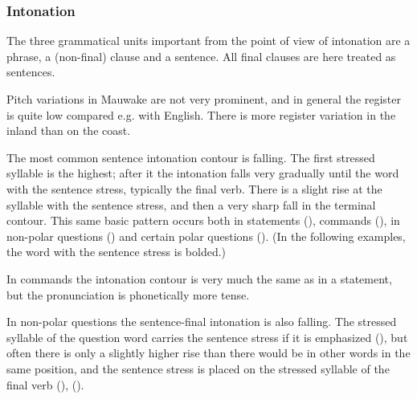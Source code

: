 \subsubsection[Intonation]{Intonation}


The three grammatical units important from the point of view of intonation are a phrase, a (non-final) clause and a sentence. All final clauses are here treated as sentences.

Pitch variations in Mauwake are not very prominent, and in general the register is quite low compared e.g. with English. There is more register variation in the inland than on the coast. 

The most common sentence intonation contour is falling. The first stressed syllable is the highest; after it the intonation falls very gradually until the word with the sentence stress, typically the final verb. There is a slight rise at the syllable with the sentence stress, and then a very sharp fall in the terminal contour.  This same basic pattern occurs both in statements (), commands (), in non-polar questions () and certain polar questions (). (In the following examples, the word with the sentence stress is bolded.)




In commands the intonation contour is very much the same as in a statement, but the pronunciation is phonetically more tense.



In non-polar questions the sentence-final intonation is also falling. The stressed syllable of the question word carries the sentence stress if it is emphasized (), but often there is only a slightly higher rise than there would be in other words in the same position, and the sentence stress is placed on the stressed syllable of the final verb (), ().




